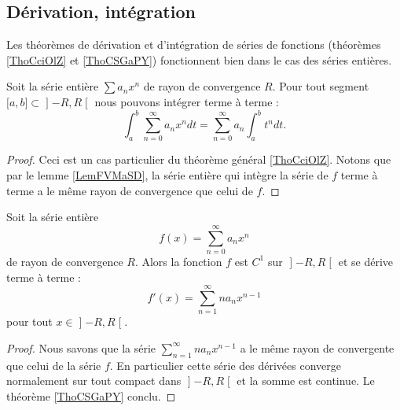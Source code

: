 \subsection{Dérivation, intégration}

Les théorèmes de dérivation et d'intégration de séries de fonctions (théorèmes \ref{ThoCciOlZ} et \ref{ThoCSGaPY}) fonctionnent bien dans le cas des séries entières.

\begin{proposition} \label{PropfeFQWr}
    Soit la série entière $\sum a_nx^n$ de rayon de convergence \( R\). Pour tout segment \( \mathopen[ a , b \mathclose]\subset\mathopen] -R , R \mathclose[\) nous pouvons intégrer terme à terme :
    \begin{equation}
        \int_a^b\sum_{n=0}^{\infty}a_nx^ndt=\sum_{n=0}^{\infty}a_n\int_a^bt^ndt.
    \end{equation}
\end{proposition}

\begin{proof}
    Ceci est un cas particulier du théorème général \ref{ThoCciOlZ}. Notons que par le lemme \ref{LemFVMaSD}, la série entière qui intègre la série de \( f\) terme à terme a le même rayon de convergence que celui de \( f\).
\end{proof}

\begin{proposition}     \label{ProptzOIuG}
    Soit la série entière
    \begin{equation}
        f(x)=\sum_{n=0}^{\infty}a_n x^n
    \end{equation}
    de rayon de convergence \( R\). Alors la fonction \( f\) est \( C^1\) sur \( \mathopen] -R , R \mathclose[\) et se dérive terme à terme :
    \begin{equation}
        f'(x)=\sum_{n=1}^{\infty}na_nx^{n-1}
    \end{equation}
    pour tout \( x\in\mathopen] -R , R \mathclose[\).
\end{proposition}

\begin{proof}
    Nous savons que la série \( \sum_{n=1}^{\infty}na_nx^{n-1}\) a le même rayon de convergente que celui de la série \( f\). En particulier cette série des dérivées converge normalement sur tout compact dans \( \mathopen] -R , R \mathclose[\) et la somme est continue. Le théorème \ref{ThoCSGaPY} conclu.
\end{proof}

